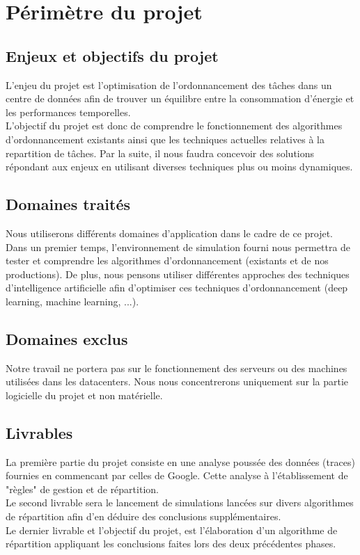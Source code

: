 \documentclass{article}
\begin{document}
\section{Périmètre du projet}
\subsection{Enjeux et objectifs du projet}
L'enjeu du projet est l'optimisation de l'\gls{ordonnancement} des tâches dans un centre de données afin de trouver un équilibre entre la consommation d'énergie et les performances temporelles.\\
L'objectif du projet est donc de comprendre le fonctionnement des algorithmes d'\gls{ordonnancement} existants ainsi que les techniques actuelles relatives à la repartition de tâches. Par la suite, il nous faudra concevoir des solutions répondant aux enjeux en utilisant diverses techniques plus ou moins dynamiques.
\subsection{Domaines traités}
Nous utiliserons différents domaines d'application dans le cadre de ce projet. Dans un premier temps, l'environnement de simulation fourni nous permettra de tester et comprendre les algorithmes d'\gls{ordonnancement} (existants et de nos productions).
De plus, nous pensons utiliser différentes approches des techniques d'intelligence artificielle afin d'optimiser ces techniques d'\gls{ordonnancement} (\gls{deep learning}, \gls{machine learning}, ...).
\subsection{Domaines exclus}
Notre travail ne portera pas sur le fonctionnement des serveurs ou des machines utilisées dans les datacenters. Nous nous concentrerons uniquement sur la partie logicielle du projet et non matérielle.
\subsection{Livrables}
La première partie du projet consiste en une analyse poussée des données (traces) fournies en commencant par celles de Google. Cette analyse à l'établissement de "règles" de gestion et de répartition. \\
Le second livrable sera le lancement de simulations lancées sur divers algorithmes de répartition afin d'en déduire des conclusions supplémentaires.\\
Le dernier livrable et l'objectif du projet, est l'élaboration d'un algorithme de répartition appliquant les conclusions faites lors des deux précédentes phases.
\end{document}
